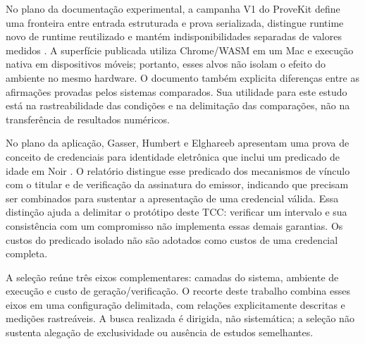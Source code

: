 No plano da documentação experimental, a campanha V1 do ProveKit define uma fronteira entre entrada estruturada e prova serializada, distingue runtime novo de runtime reutilizado e mantém indisponibilidades separadas de valores medidos \cite{provekitcampaign}. A superfície publicada utiliza Chrome/WASM em um Mac e execução nativa em dispositivos móveis; portanto, esses alvos não isolam o efeito do ambiente no mesmo hardware. O documento também explicita diferenças entre as afirmações provadas pelos sistemas comparados. Sua utilidade para este estudo está na rastreabilidade das condições e na delimitação das comparações, não na transferência de resultados numéricos.

No plano da aplicação, Gasser, Humbert e Elghareeb apresentam uma prova de conceito de credenciais para identidade eletrônica que inclui um predicado de idade em Noir \cite{eidreport}. O relatório distingue esse predicado dos mecanismos de vínculo com o titular e de verificação da assinatura do emissor, indicando que precisam ser combinados para sustentar a apresentação de uma credencial válida. Essa distinção ajuda a delimitar o protótipo deste TCC: verificar um intervalo e sua consistência com um compromisso não implementa essas demais garantias. Os custos do predicado isolado não são adotados como custos de uma credencial completa.

A seleção reúne três eixos complementares: camadas do sistema, ambiente de execução e custo de geração/verificação. O recorte deste trabalho combina esses eixos em uma configuração delimitada, com relações explicitamente descritas e medições rastreáveis. A busca realizada é dirigida, não sistemática; a seleção não sustenta alegação de exclusividade ou ausência de estudos semelhantes.
